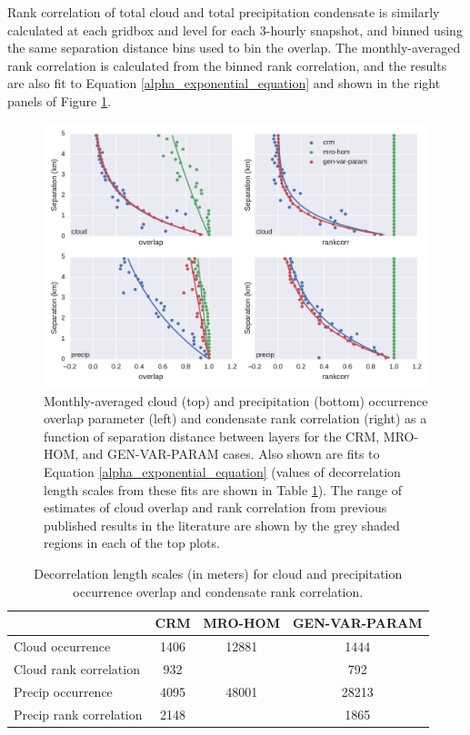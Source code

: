 Rank correlation of total cloud and total precipitation condensate is similarly calculated at each gridbox and level for each 3-hourly snapshot, and binned using the same separation distance bins used to bin the overlap. The monthly-averaged rank correlation is calculated from the binned rank correlation, and the results are also fit to Equation \ref{alpha_exponential_equation} and shown in the right panels of Figure \ref{overlap_rankcorr}. 

\begin{figure}
\includegraphics[width=\columnwidth]{graphics/subgrid2_overlap.pdf}
\caption{Monthly-averaged cloud (top) and precipitation (bottom) occurrence overlap parameter (left) and condensate rank correlation (right) as a function of separation distance between layers for the CRM, MRO-HOM, and GEN-VAR-PARAM cases. Also shown are fits to Equation \ref{alpha_exponential_equation} (values of decorrelation length scales from these fits are shown in Table \ref{table_overlap_rankcorr}). The range of estimates of cloud overlap and rank correlation from previous published results in the literature are shown by the grey shaded regions in each of the top plots.}
\label{overlap_rankcorr}
\end{figure}

\begin{table}
\centering
\begin{tabular}{lccc}
                        & CRM   & MRO-HOM   & GEN-VAR-PARAM\\ \hline
Cloud occurrence        & 1406  & 12881     & 1444   \\
Cloud rank correlation  &  932  &           & 792   \\
Precip occurrence       & 4095  & 48001     & 28213  \\
Precip rank correlation & 2148  &           & 1865  \\
\end{tabular}
\caption{Decorrelation length scales (in meters) for cloud and precipitation occurrence overlap and condensate rank correlation.}
\label{table_overlap_rankcorr}
\end{table}

